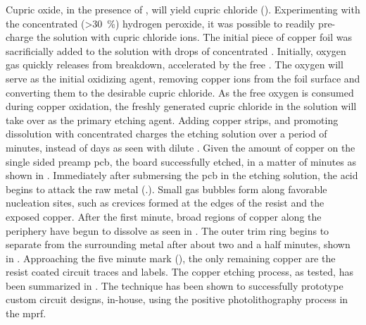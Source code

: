 \documentclass[../../main.tex]{subfiles}
\begin{document}
    Cupric oxide, in the presence of , will yield cupric chloride ().
    Experimenting with the concentrated (\SI{>30}{\percent}) hydrogen peroxide, it was possible to readily pre-charge the solution with cupric chloride ions.
    The initial piece of copper foil was sacrificially added to the solution with drops of concentrated . 
    Initially, oxygen gas quickly releases from  breakdown, accelerated by the free .
    The oxygen will serve as the initial oxidizing agent, removing copper ions from the foil surface and converting them to the desirable cupric chloride.
    As the free oxygen is consumed during copper oxidation, the freshly generated cupric chloride in the solution will take over as the primary etching agent.
    Adding copper strips, and promoting dissolution with concentrated  charges the etching solution over a period of minutes, instead of days as seen with dilute .
    Given the amount of copper on the single sided \gls{preamp} \gls{pcb}, the board successfully etched, in a matter of minutes as shown in  .
    Immediately after submersing the \gls{pcb} in the etching solution, the acid begins to attack the raw metal (.).
    Small gas bubbles form along favorable nucleation sites, such as crevices formed at the edges of the resist and the exposed copper.
    After the first minute, broad regions of copper along the periphery have begun to dissolve as seen in .
    The outer trim ring begins to separate from the surrounding metal after about two and a half minutes, shown in .
    Approaching the five minute mark (), the only remaining copper are the resist coated circuit traces and labels.
    The copper etching process, as tested, has been summarized in .
    The technique has been shown to successfully prototype custom circuit designs, in-house, using the positive photolithography process in the \gls{mprf}. 
\end{document}
